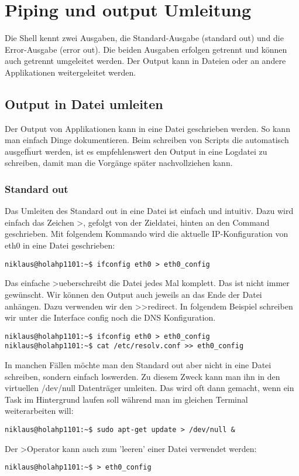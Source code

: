 \section{Piping und output Umleitung}
Die Shell kennt zwei Ausgaben, die Standard-Ausgabe (standard out) und die Error-Ausgabe (error out). Die beiden Ausgaben erfolgen getrennt und k\"onnen auch getrennt umgeleitet werden. Der Output kann in Dateien oder an andere Applikationen weitergeleitet werden.
\subsection{Output in Datei umleiten}
Der Output von Applikationen kann in eine Datei geschrieben werden. So kann man einfach Dinge dokumentieren. Beim schreiben von Scripts die automatisch ausgef\"hurt werden, ist es empfehlenswert den Output in eine Logdatei zu schreiben, damit man die Vorg\"ange sp\"ater nachvollziehen kann.
\subsubsection{Standard out}
Das Umleiten des Standard out in eine Datei ist einfach und intuitiv. Dazu wird einfach das Zeichen \textgreater, gefolgt von der Zieldatei, hinten an den Command geschrieben. Mit folgendem Kommando wird die aktuelle IP-Konfiguration von eth0 in eine Datei geschrieben:
\begin{lstlisting}
niklaus@holahp1101:~$ ifconfig eth0 > eth0_config
\end{lstlisting}
Das einfache \textgreater ueberschreibt die Datei jedes Mal komplett. Das ist nicht immer gew\"unscht. Wir k\"onnen den Output auch jeweils an das Ende der Datei anh\"angen. Dazu verwenden wir den \textgreater\textgreater redirect. In folgendem Beispiel schreiben wir unter die Interface config noch die DNS Konfiguration.
\begin{lstlisting}
niklaus@holahp1101:~$ ifconfig eth0 > eth0_config
niklaus@holahp1101:~$ cat /etc/resolv.conf >> eth0_config
\end{lstlisting}
In manchen F\"allen m\"ochte man den Standard out aber nicht in eine Datei schreiben, sondern einfach loswerden. Zu diesem Zweck kann man ihn in den virtuellen /dev/null Datentr\"ager umleiten. Das wird oft dann gemacht, wenn ein Task im Hintergrund laufen soll w\"ahrend man im gleichen Terminal weiterarbeiten will:
\begin{lstlisting}
niklaus@holahp1101:~$ sudo apt-get update > /dev/null &
\end{lstlisting}
Der \textgreater Operator kann auch zum 'leeren' einer Datei verwendet werden:
\begin{lstlisting}
niklaus@holahp1101:~$ > eth0_config
\end{lstlisting}
